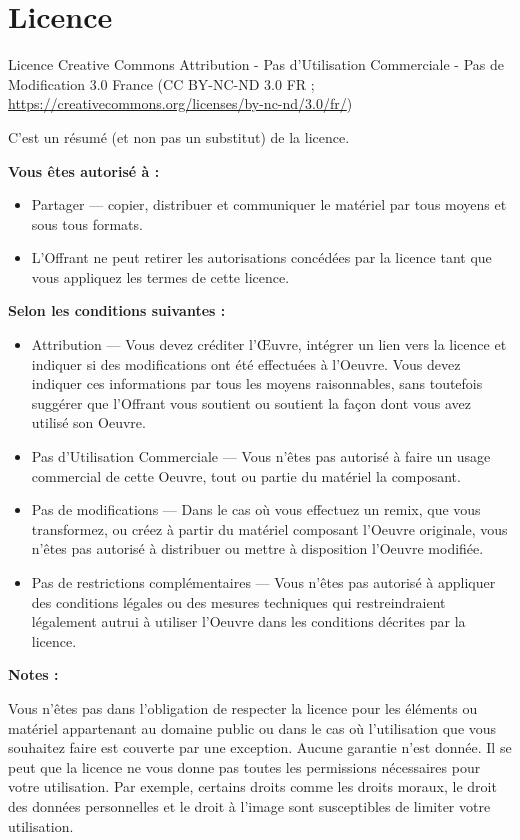 \documentclass[]{book}
\providecommand{\tightlist}{%
  \setlength{\itemsep}{0pt}\setlength{\parskip}{0pt}}
\begin{document}
\chapter{Licence}\label{licence}

Licence Creative Commons Attribution - Pas d'Utilisation Commerciale -
Pas de Modification 3.0 France (CC BY-NC-ND 3.0 FR ;
\url{https://creativecommons.org/licenses/by-nc-nd/3.0/fr/})

C'est un résumé (et non pas un substitut) de la licence.

\textbf{Vous êtes autorisé à :}

\begin{itemize}
\tightlist
\item
  Partager --- copier, distribuer et communiquer le matériel par tous
  moyens et sous tous formats.
\item
  L'Offrant ne peut retirer les autorisations concédées par la licence
  tant que vous appliquez les termes de cette licence.
\end{itemize}

\textbf{Selon les conditions suivantes :}

\begin{itemize}
\item
  Attribution --- Vous devez créditer l'Œuvre, intégrer un lien vers la
  licence et indiquer si des modifications ont été effectuées à
  l'Oeuvre. Vous devez indiquer ces informations par tous les moyens
  raisonnables, sans toutefois suggérer que l'Offrant vous soutient ou
  soutient la façon dont vous avez utilisé son Oeuvre.
\item
  Pas d'Utilisation Commerciale --- Vous n'êtes pas autorisé à faire un
  usage commercial de cette Oeuvre, tout ou partie du matériel la
  composant.
\item
  Pas de modifications --- Dans le cas où vous effectuez un remix, que
  vous transformez, ou créez à partir du matériel composant l'Oeuvre
  originale, vous n'êtes pas autorisé à distribuer ou mettre à
  disposition l'Oeuvre modifiée.
\item
  Pas de restrictions complémentaires --- Vous n'êtes pas autorisé à
  appliquer des conditions légales ou des mesures techniques qui
  restreindraient légalement autrui à utiliser l'Oeuvre dans les
  conditions décrites par la licence.
\end{itemize}

\textbf{Notes :}

Vous n'êtes pas dans l'obligation de respecter la licence pour les
éléments ou matériel appartenant au domaine public ou dans le cas où
l'utilisation que vous souhaitez faire est couverte par une exception.
Aucune garantie n'est donnée. Il se peut que la licence ne vous donne
pas toutes les permissions nécessaires pour votre utilisation. Par
exemple, certains droits comme les droits moraux, le droit des données
personnelles et le droit à l'image sont susceptibles de limiter votre
utilisation.
\end{document}
